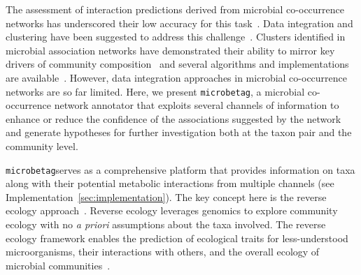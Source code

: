 \documentclass[sn-mathphys,Numbered]{sn-jnl}  %
\theoremstyle{thmstyleone}%
\theoremstyle{thmstyletwo}%
\theoremstyle{thmstylethree}%
\newcommand{\microbetag}{\texttt{microbetag}}
\begin{document}
    The assessment of interaction predictions derived from microbial co-occurrence networks has underscored their low accuracy for this task~\cite{berry2014deciphering}.
    Data integration and clustering have been suggested to address this challenge~\cite{faust2021open}.
    Clusters identified in microbial association networks have demonstrated their ability to mirror key drivers of community composition~\cite{guidi2016plankton} and several algorithms and implementations are available~\cite{rottjers2020manta}.
    However, data integration approaches in microbial co-occurrence networks are so far limited.
    Here, we present \microbetag, a microbial co-occurrence network annotator that exploits several channels of information to enhance or reduce the confidence of the associations suggested by the network and generate hypotheses for further investigation both at the taxon pair and the community level.

    \microbetag serves as a comprehensive platform that provides information on taxa along with their potential metabolic interactions from multiple channels 
    (see Implementation~\ref{sec:implementation}).
    The key concept here is the reverse ecology approach~\cite{levy2012reverse}.
    Reverse ecology leverages genomics to explore community ecology with no \textit{a priori} assumptions about the taxa involved.
    The reverse ecology framework enables the prediction of ecological traits for less-understood microorganisms, their interactions with others, and the overall ecology of microbial communities~\cite{levy2014metagenomic}.
\end{document}
